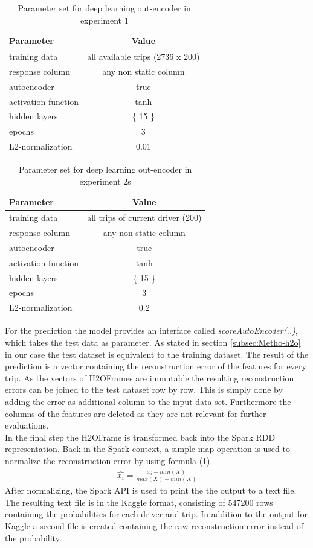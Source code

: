 \documentclass{vldb}
\begin{document}
\begin{table}
\centering
\begin{tabular}{l | c}
Parameter            & Value\\ \hline
training data        & all available trips (2736 x 200) \\
response column      & any non static column \\
autoencoder          & true \\
activation function  & tanh \\
hidden layers        & \{ 15 \}\\
epochs               & 3\\
L2-normalization     & 0.01
\end{tabular}
\caption{Parameter set for deep learning out-encoder in experiment 1}
\label{table:param-set-exp1}
\end{table}

\begin{table}
\centering
\begin{tabular}{l | c}
Parameter            & Value\\ \hline
training data        & all trips of current driver (200) \\
response column      & any non static column \\
autoencoder          & true \\
activation function  & tanh \\
hidden layers        & \{ 15 \}\\
epochs               & 3\\
L2-normalization     & 0.2
\end{tabular}
\caption{Parameter set for deep learning out-encoder in experiment 2s}
\label{table:param-set-exp2}
\end{table}

For the prediction the model provides an interface called \textit{scoreAutoEncoder(..)}, which takes the test data as parameter. As stated in section \ref{subsec:Metho-h2o} in our case the test dataset is equivalent to the training dataset. The result of the prediction is a vector containing the reconstruction error of the features for every trip. As the vectors of H2OFrames are immutable the resulting reconstruction errors can be joined to the test dataset row by row. This is simply done by adding the error as additional column to the input data set. Furthermore the columns of the features are deleted as they are not relevant for further evaluations. \\
In the final step the H2OFrame is transformed back into the Spark RDD representation. Back in the Spark context,  a simple map operation is used to  normalize the reconstruction error by using formula (1).
\begin{align}
\hat{x_i} = \frac{x_i - min(X)}{max(X) - min(X)}
\end{align}
After normalizing, the Spark API is used to print the the output to a text file. The resulting text file is in the Kaggle format, consisting of 547200 rows containing the probabilities for each driver and trip. In addition to the output for Kaggle a second file is created containing the raw reconstruction error instead of the probability.
\end{document}
